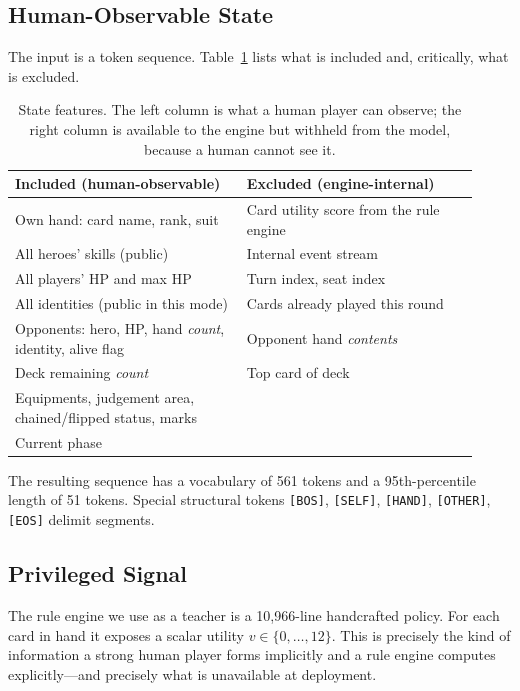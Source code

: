 \documentclass[11pt]{article}
\begin{document}
\subsection{Human-Observable State}

The input is a token sequence. Table~\ref{tab:state} lists what is included and, critically, what is excluded.

\begin{table}[t]
\centering
\small
\begin{tabular}{@{}p{0.46\linewidth}p{0.46\linewidth}@{}}
\toprule
\textbf{Included (human-observable)} & \textbf{Excluded (engine-internal)} \\
\midrule
Own hand: card name, rank, suit & Card utility score from the rule engine \\
All heroes' skills (public) & Internal event stream \\
All players' HP and max HP & Turn index, seat index \\
All identities (public in this mode) & Cards already played this round \\
Opponents: hero, HP, hand \emph{count}, identity, alive flag & Opponent hand \emph{contents} \\
Deck remaining \emph{count} & Top card of deck \\
Equipments, judgement area, chained/flipped status, marks & \\
Current phase & \\
\bottomrule
\end{tabular}
\caption{State features. The left column is what a human player can observe; the right column is available to the engine but withheld from the model, because a human cannot see it.}
\label{tab:state}
\end{table}

The resulting sequence has a vocabulary of 561 tokens and a 95th-percentile length of 51 tokens. Special structural tokens \texttt{[BOS]}, \texttt{[SELF]}, \texttt{[HAND]}, \texttt{[OTHER]}, \texttt{[EOS]} delimit segments.

\subsection{Privileged Signal}

The rule engine we use as a teacher is a 10,966-line handcrafted policy. For each card in hand it exposes a scalar utility $v \in \{0,\dots,12\}$. This is precisely the kind of information a strong human player forms implicitly and a rule engine computes explicitly---and precisely what is unavailable at deployment.
\end{document}
